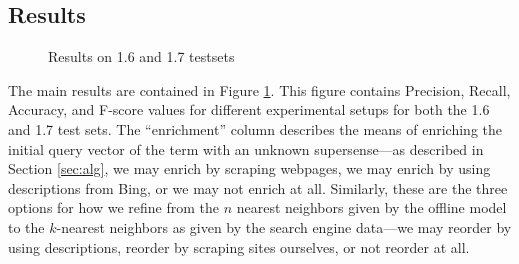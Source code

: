\documentclass{article}
\begin{document}
\subsection{Results}
\begin{figure}[hbtp]
\caption{Results on 1.6 and 1.7 testsets}
\label{fig:res}
\end{figure}

The main results are contained in Figure \ref{fig:res}.
This figure contains Precision, Recall, Accuracy, and F-score values for different experimental setups for both the 1.6 and 1.7 test sets.
The ``enrichment'' column describes the means of enriching the initial query vector of the term with an unknown supersense---as described in Section \ref{sec:alg}, we may enrich by scraping webpages, we may enrich by using descriptions from Bing, or we may not enrich at all.
Similarly, these are the three options for how we refine from the $n$ nearest neighbors given by the offline model to the $k$-nearest neighbors as given by the search engine data---we may reorder by using descriptions, reorder by scraping sites ourselves, or not reorder at all.
\end{document}
